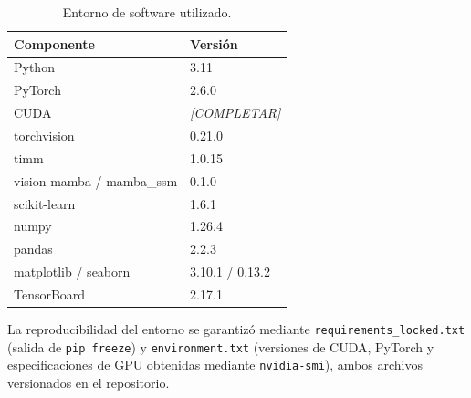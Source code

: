 \begin{table}[H]
\centering
\caption{Entorno de software utilizado.}
\label{tab:software}
\begin{tabular}{ll}
\hline
Componente              & Versión \\
\hline
Python                  & 3.11 \\
PyTorch                 & 2.6.0 \\
CUDA                    & \textit{[COMPLETAR]} \\
torchvision             & 0.21.0 \\
timm                    & 1.0.15 \\
vision-mamba / mamba\_ssm & 0.1.0 \\
scikit-learn            & 1.6.1 \\
numpy                   & 1.26.4 \\
pandas                  & 2.2.3 \\
matplotlib / seaborn    & 3.10.1 / 0.13.2 \\
TensorBoard             & 2.17.1 \\
\hline
\end{tabular}
\end{table}

La reproducibilidad del entorno se garantizó mediante \texttt{requirements\_locked.txt}
(salida de \texttt{pip freeze}) y \texttt{environment.txt} (versiones de CUDA, PyTorch y
especificaciones de GPU obtenidas mediante \texttt{nvidia-smi}), ambos archivos versionados
en el repositorio.
